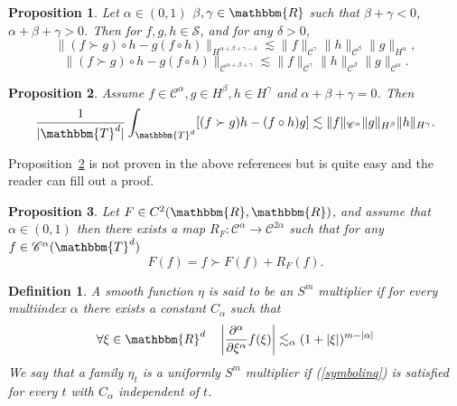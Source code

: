 \documentclass[11pt, oneside]{article}   	%
\newtheorem{definition}{Definition}
\newtheorem{proposition}{Proposition}
{\theorembodyfont{\rmfamily}\newtheorem{remark}{Remark}}
\newcommand{\VV}{\mathscr{C}}
\newcommand{\CS}{\mathscr{S}}
\begin{document}
\begin{proposition}
  \label{commutatorestimate}Let $\alpha \in (0, 1)$ $\beta, \gamma \in
  \mathbbm{R}$ such that $\beta + \gamma < 0$, $\alpha + \beta + \gamma > 0$.
  Then for $f, g, h \in \CS$, and for any $\delta > 0$,
  \[ \| (f \succ g) \circ h - g (f \circ h) \|_{H^{\alpha + \beta + \gamma -
     \delta}} \lesssim \| f \|_{\VV^{\gamma}} \| h \|_{\VV^{\beta}} \| g
     \|_{H^{\alpha}}, \]
  \[ \| (f \succ g) \circ h - g (f \circ h) \|_{\VV^{\alpha + \beta + \gamma}}
     \lesssim \| f \|_{\VV^{\gamma}} \| h \|_{\VV^{\beta}} \| g
     \|_{\VV^{\alpha}} . \]
\end{proposition}

\begin{proposition}
  \label{adjointparaproduct}Assume $f \in \VV^{\alpha}, g \in H^{\beta}, h \in
  H^{\gamma}$ and $\alpha + \beta + \gamma = 0$. Then
  \[ \frac{1}{| \mathbbm{T}^d |} \int_{\mathbbm{T}^d} [(f \succ g) h - (f
     \circ h) g] \lesssim \| f \|_{\VV^{\alpha}} \| g \|_{H^{\beta}} \| h
     \|_{H^{\gamma}} . \]
\end{proposition}

\begin{remark}
  Proposition~\ref{adjointparaproduct} is not proven in the above references
  but is quite easy and the reader can fill out a proof.
\end{remark}

\begin{proposition}
  \label{paralinearization}Let $F \in C^2 (\mathbbm{R}, \mathbbm{R})$, and
  assume that $\alpha \in (0, 1)$ then there exists a map $R_F : \VV^{\alpha}
  \rightarrow \VV^{2 \alpha}$ such that for any $f \in \VV^{\alpha}
  (\mathbbm{T}^d)$
  \[ F (f) = f \succ F (f) + R_F (f) . \]
\end{proposition}

\begin{definition}
  A smooth function $\eta$ is said to be an $S^m$ multiplier if for every
  multiindex $\alpha$ there exists a constant $C_{\alpha}$ such that
  \begin{equation}
    \label{symbolinq} \forall \xi \in \mathbbm{R}^d \quad \left|
    \frac{\partial^{\alpha}}{\partial \xi^{\alpha}} f (\xi) \right|
    \lesssim_{\alpha} (1 + | \xi |)^{m - | \alpha |}
  \end{equation}
  We say that a family $\eta_t$ is a uniformly $S^m$ multiplier if
  (\ref{symbolinq}) is satisfied for every $t$ with $C_{\alpha}$ independent
  of $t$. 
\end{definition}
\end{document}
